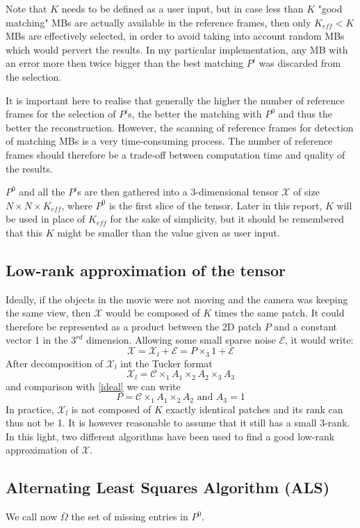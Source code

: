 \documentclass[a4paper, 11pt]{article} %
\def \be {\begin{equation*}}
\def \ee {\end{equation*}}
\def \bee {\begin{equation}}
\def \eee {\end{equation}}
\def \X {\mathcal{X}}
\def \t {\times}
\def \C {\mathcal{C}}
\def \E {\mathcal{E}}
\def \Xl {\mathcal{X}_{l}}
\begin{document}
Note that $K$ needs to be defined as a user input, but in case less than $K$ "good matching" MBs are actually available in the reference frames, then only $K_{eff}<K$ MBs are effectively selected, in order to avoid taking into account random MBs which would pervert the results. 
In my particular implementation, any MB with an error more then twice bigger than the best matching $P^i$ was discarded from the selection.

It is important here to realise that generally the higher the number of reference frames for the selection of $P^i$s, the better the matching with $P^0$ and thus the better the reconstruction. However, the scanning of reference frames for detection of matching MBs is a very time-consuming process. The number of reference frames should therefore be a trade-off between computation time and quality of the results. 

$P^0$ and all the $P^i$s are then gathered into a 3-dimensional tensor $\X$ of size $N\t N\t K_{eff}$, where $P^0$ is the first slice of the tensor. Later in this report, $K$ will be used in place of $K_{eff}$ for the sake of simplicity, but it should be remembered that this $K$ might be smaller than the value given as user input.

\subsection{Low-rank approximation of the tensor}

Ideally, if the objects in the movie were not moving and the camera was keeping the same view, then $\X$ would be composed of $K$ times the same patch. It could therefore be represented as a product between the 2D patch $P$ and a constant vector 1 in the $3^{rd}$ dimension. Allowing some small sparse noise $\mathcal{E}$, it would write:
\bee
\X= \Xl+\E=P\t_3 1+\E
\label{ideal}
\eee
After decomposition of $\Xl$ int the Tucker format
\be
\X_l=\C\t_1 A_1 \t_2 A_2 \t_3 A_3
\ee
and comparison with \ref{ideal} we can write
\be
P=\C \t_1 A_1\t_2 A_2 \mbox{ and } A_3=1
\ee
In practice, $\Xl$ is not composed of $K$ exactly identical patches and its rank can thus not be 1. It is however reasonable to assume that it still has a small 3-rank. In this light, two different algorithms have been used to find a good low-rank approximation of $\X$.
\subsection{Alternating Least Squares Algorithm (ALS)}
We call now $\bar{\Omega}$ the set of missing entries in $P^0$.
\end{document}
